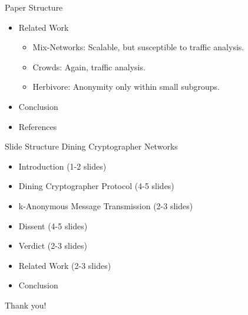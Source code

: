 \documentclass[]{beamer}
\begin{document}
\begin{frame}[allowframebreaks]{Paper Structure}
\begin{itemize}
    \item Related Work

        \begin{itemize}
        \item Mix-Networks: Scalable, but susceptible to traffic analysis.
        \item Crowds: Again, traffic analysis.
        \item Herbivore: Anonymity only within small subgroups.
        \end{itemize}

    \item Conclusion

    \item References
    \end{itemize}
\end{frame}

\begin{frame}[allowframebreaks]{Slide Structure}
    Dining Cryptographer Networks
    
    \begin{itemize}
    \item Introduction (1-2 slides)
    \item Dining Cryptographer Protocol (4-5 slides)
    \item k-Anonymous Message Transmission (2-3 slides)
    \item Dissent (4-5 slides)
    \item Verdict (2-3 slides)
    \item Related Work (2-3 slides)
    \item Conclusion
    \end{itemize}
    
\end{frame}

\begin{titleframe}
    \begin{center}
    \alert{\Large Thank you!}
    \end{center}
\end{titleframe}
\end{document}
